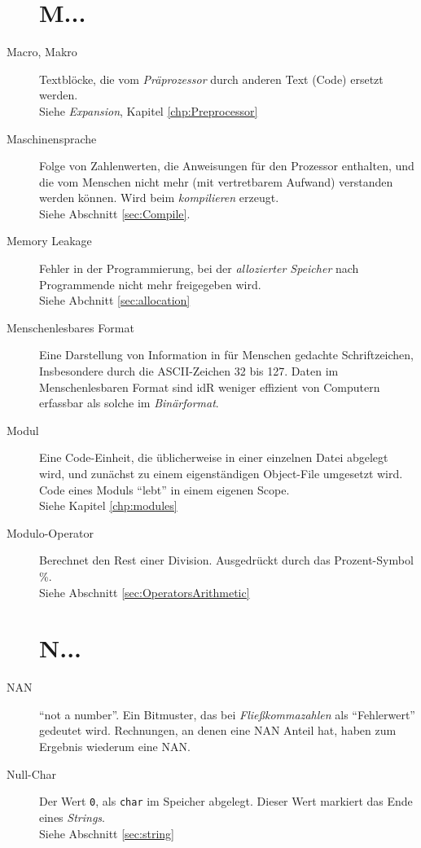 \begin{appendices}
\begin{description}
\section*{M...}
\item[Macro, Makro] Textblöcke, die vom \emph{Präprozessor} durch anderen Text (Code) ersetzt werden.\\
	Siehe \emph{Expansion}, Kapitel \ref{chp:Preprocessor}
\item[Maschinensprache] Folge von Zahlenwerten, die Anweisungen für den Prozessor enthalten, und die
	vom Menschen nicht mehr (mit vertretbarem Aufwand) verstanden werden können. Wird beim
	\emph{kompilieren} erzeugt.\\
	Siehe Abschnitt \ref{sec:Compile}.
\item[Memory Leakage] Fehler in der Programmierung, bei der \emph{allozierter Speicher} nach
	Programmende nicht mehr freigegeben wird.\\
	Siehe Abchnitt \ref{sec:allocation}
\item[Menschenlesbares Format] Eine Darstellung von Information in für Menschen gedachte Schriftzeichen,
	Insbesondere durch die ASCII-Zeichen 32 bis 127. Daten im Menschenlesbaren Format sind idR weniger
	effizient von Computern erfassbar als solche im \emph{Binärformat}.
\item[Modul] Eine Code-Einheit, die üblicherweise in einer einzelnen Datei abgelegt wird, und zunächst
	zu einem eigenständigen Object-File umgesetzt wird. Code eines Moduls \enquote{lebt} in einem
	eigenen Scope.\\
	Siehe Kapitel \ref{chp:modules}
\item[Modulo-Operator] Berechnet den Rest einer Division. Ausgedrückt durch das Prozent-Symbol \%.\\
	Siehe Abschnitt \ref{sec:OperatorsArithmetic}

\section*{N...}
\item[NAN] \enquote{not a number}. Ein Bitmuster, das bei \emph{Fließkommazahlen} als
	\enquote{Fehlerwert} gedeutet wird. Rechnungen, an denen eine NAN Anteil hat, haben zum Ergebnis
	wiederum eine NAN.
\item[Null-Char] Der Wert \texttt{0}, als \texttt{char} im Speicher abgelegt. Dieser Wert
	markiert das Ende eines \emph{Strings}.\\
	Siehe Abschnitt \ref{sec:string}


\end{description}
\end{appendices}
